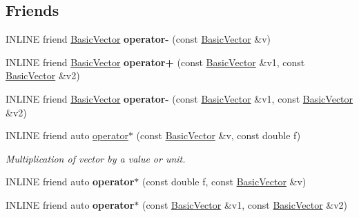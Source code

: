 \subsection*{Friends}
\begin{DoxyCompactItemize}
\item 
\hypertarget{classBasicVector_3_01double_01_4_a1f307378bb3c5832f697c8932d79848c}{}\label{classBasicVector_3_01double_01_4_a1f307378bb3c5832f697c8932d79848c} 
I\+N\+L\+I\+NE friend \hyperlink{classBasicVector}{Basic\+Vector} {\bfseries operator-\/} (const \hyperlink{classBasicVector}{Basic\+Vector} \&v)
\item 
\hypertarget{classBasicVector_3_01double_01_4_a52a8854619f1dbb9760107773b8631fe}{}\label{classBasicVector_3_01double_01_4_a52a8854619f1dbb9760107773b8631fe} 
I\+N\+L\+I\+NE friend \hyperlink{classBasicVector}{Basic\+Vector} {\bfseries operator+} (const \hyperlink{classBasicVector}{Basic\+Vector} \&v1, const \hyperlink{classBasicVector}{Basic\+Vector} \&v2)
\item 
\hypertarget{classBasicVector_3_01double_01_4_a752028cbae3f96cf020d4e9673faaecd}{}\label{classBasicVector_3_01double_01_4_a752028cbae3f96cf020d4e9673faaecd} 
I\+N\+L\+I\+NE friend \hyperlink{classBasicVector}{Basic\+Vector} {\bfseries operator-\/} (const \hyperlink{classBasicVector}{Basic\+Vector} \&v1, const \hyperlink{classBasicVector}{Basic\+Vector} \&v2)
\item 
\hypertarget{classBasicVector_3_01double_01_4_a831ac08f608d32809b63c5a8b9ef8ded}{}\label{classBasicVector_3_01double_01_4_a831ac08f608d32809b63c5a8b9ef8ded} 
I\+N\+L\+I\+NE friend auto \hyperlink{classBasicVector_3_01double_01_4_a831ac08f608d32809b63c5a8b9ef8ded}{operator$\ast$} (const \hyperlink{classBasicVector}{Basic\+Vector} \&v, const double f)
\begin{DoxyCompactList}\small\item\em Multiplication of vector by a value or unit. \end{DoxyCompactList}\item 
\hypertarget{classBasicVector_3_01double_01_4_ad841a897418216fb6b1405409e1a65eb}{}\label{classBasicVector_3_01double_01_4_ad841a897418216fb6b1405409e1a65eb} 
I\+N\+L\+I\+NE friend auto {\bfseries operator$\ast$} (const double f, const \hyperlink{classBasicVector}{Basic\+Vector} \&v)
\item 
\hypertarget{classBasicVector_3_01double_01_4_afec38b18caebad20ce14e3d89ac6a272}{}\label{classBasicVector_3_01double_01_4_afec38b18caebad20ce14e3d89ac6a272} 
I\+N\+L\+I\+NE friend auto {\bfseries operator$\ast$} (const \hyperlink{classBasicVector}{Basic\+Vector} \&v1, const \hyperlink{classBasicVector}{Basic\+Vector} \&v2)

\end{DoxyCompactItemize}

